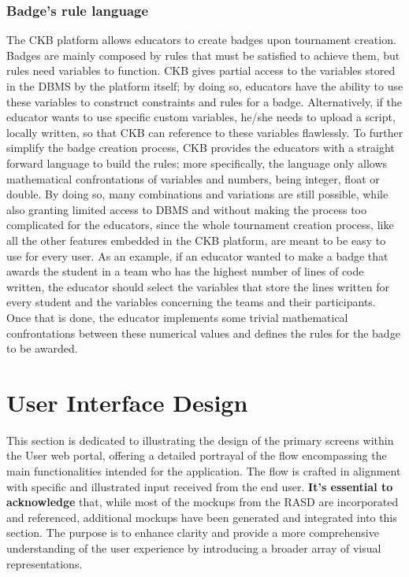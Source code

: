 \documentclass[12pt,oneside,a4paper]{article}
\begin{document}
\subsubsection{Badge's rule language}
The CKB platform allows educators to create badges upon tournament creation. Badges are mainly composed by rules that must be satisfied to achieve them, but rules need variables to function. CKB gives partial access to the variables stored in the DBMS by the platform itself; by doing so, educators have the ability to use these variables to construct constraints and rules for a badge. Alternatively, if the educator wants to use specific custom variables, he/she needs to upload a script, locally written, so that CKB can reference to these variables flawlessly. To further simplify the badge creation process, CKB provides the educators with a straight forward language to build the rules; more specifically, the language only allows mathematical confrontations of variables and numbers, being integer, float or double. By doing so, many combinations and variations are still possible, while also granting limited access to DBMS and without making the process too complicated for the educators, since the whole tournament creation process, like all the other features embedded in the CKB platform, are meant to be easy to use for every user. As an example, if an educator wanted to make a badge that awards the student in a team who has the highest number of lines of code written, the educator should select the variables that store the lines written for every student and the variables concerning the teams and their participants. Once that is done, the educator implements some trivial mathematical confrontations between these numerical values and defines the rules for the badge to be awarded.

\clearpage



\section{User Interface Design}
This section is dedicated to illustrating the design of the primary screens within the User web portal, offering a detailed portrayal of the flow encompassing the main functionalities intended for the application. The flow is crafted in alignment with specific and illustrated input received from the end user. \textbf{It's essential to acknowledge} that, while most of the mockups from the RASD are incorporated and referenced, additional mockups have been generated and integrated into this section. The purpose is to enhance clarity and provide a more comprehensive understanding of the user experience by introducing a broader array of visual representations.
\end{document}
